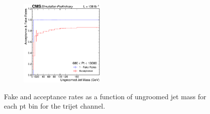 \begin{figure}[htp!]
        \begin{subfigure}
          \centering
          \includegraphics[width=0.45\textwidth]{figures/multijet/trijet/fakerates_ungroomed_3.pdf}
        \end{subfigure}
        \caption{Fake and acceptance rates as a function of ungroomed jet mass for each pt bin for the trijet channel.}
	\label{fig:fakeratesbinned_trijet_u}
      \end{figure}

